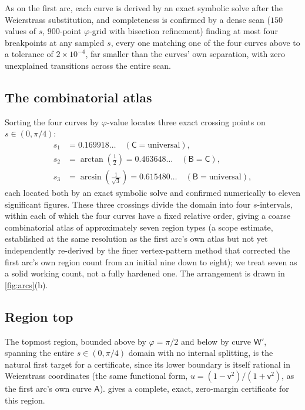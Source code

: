 \documentclass[11pt,reqno]{amsart}
\renewcommand{\_}{\origunderscore\allowbreak}
\numberwithin{equation}{section}
\theoremstyle{plain}
\theoremstyle{definition}
\theoremstyle{remark}
\newcommand{\tilt}{\varphi}                  %
\newcommand{\arcp}{s}                        %
\newcommand{\base}{u}                        %
\begin{document}
As on the first arc, each curve is derived by an exact symbolic solve
after the Weierstrass substitution, and completeness is confirmed by a
dense scan ($150$ values of $\arcp$, $900$-point $\tilt$-grid with
bisection refinement) finding at most four breakpoints at any sampled
$\arcp$, every one matching one of the four curves above to a tolerance
of $2\times10^{-4}$, far smaller than the curves' own separation, with
zero unexplained transitions across the entire scan.

\subsection{The combinatorial atlas}

Sorting the four curves by $\tilt$-value locates three exact crossing
points on $\arcp\in(0,\pi/4)$:
\[
  \begin{aligned}
  \arcp_1 &= 0.169918\ldots \quad (\mathsf C=\text{universal}), \\
  \arcp_2 &= \arctan(\tfrac12) = 0.463648\ldots\quad (\mathsf B=\mathsf C), \\
  \arcp_3 &= \arcsin(\tfrac1{\sqrt3}) = 0.615480\ldots\quad (\mathsf B=\text{universal}),
  \end{aligned}
\]
each located both by an exact symbolic solve and confirmed numerically
to eleven significant figures. These three crossings divide the domain
into four $\arcp$-intervals, within each of which the four curves have a
fixed relative order, giving a coarse combinatorial atlas of
approximately seven region types (a scope estimate, established at the
same resolution as the first arc's own atlas but not yet independently
re-derived by the finer vertex-pattern method that corrected the first
arc's own region count from an initial nine down to eight); we treat
seven as a solid working count, not a fully hardened one. The
arrangement is drawn in \cref{fig:arcs}(b).

\subsection{Region top}

The topmost region, bounded above by $\tilt=\pi/2$ and below by curve
$\mathsf W'$, spanning the entire $\arcp\in(0,\pi/4)$ domain with no
internal splitting, is the natural first target for a certificate,
since its lower boundary is itself rational in Weierstrass coordinates
(the same functional form, $\base=(1-\mathsf v^2)/(1+\mathsf v^2)$, as
the first arc's own curve $\mathsf A$).  gives a
complete, exact, zero-margin certificate for this region.
\end{document}

